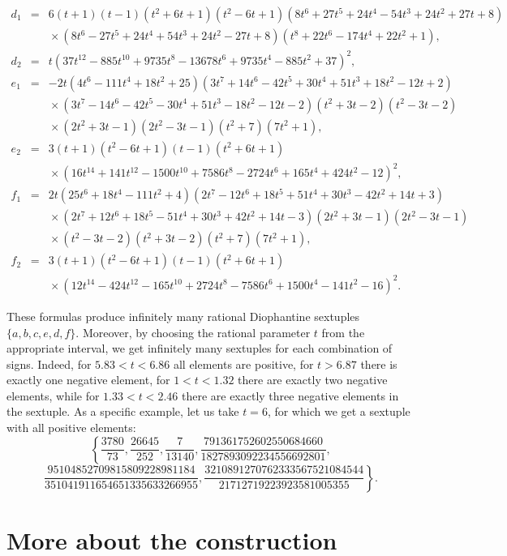 \documentclass[11pt]{amsart}
\theoremstyle{plain}
\theoremstyle{remark}
\begin{document}
{\small
\begin{eqnarray*}
d_1&\!\!=\!\!& 6(t+1)(t-1)(t^2+6t+1)(t^2-6t+1)(8t^6+27t^5+24t^4-54t^3+24t^2+27t+8) \\
& & \mbox{}\times (8t^6-27t^5+24t^4+54t^3+24t^2-
27t+8)(t^8+22t^6-174t^4+22t^2+1), \\
d_2&\!\!=\!\!&t(37t^{12}-885t^{10}+9735t^8-13678t^6+9735t^4-885t^2+37)^2, \\
e_1&\!\!=\!\!&
-2t(4t^6-111t^4+18t^2+25)(3t^7+14t^6-42t^5+30t^4+51t^3+18t^2-12t+2) \\
& & \mbox{}\times (3t^7-14t^6-42t^5-
30t^4+51t^3-18t^2-12t-2)(t^2+3t-2)(t^2-3t-2)\\
& & \mbox{}\times (2t^2+3t-1)(2t^2-3t-1)(t^2+7)(7t^2+1), \\
e_2&\!\!=\!\!&
3(t+1)(t^2-6t+1)(t-1)(t^2+6t+1) \\
& & \mbox{}\times (16t^{14}+141t^{12}-1500t^{10}+7586t^8-2724t^6+165t^4+424t^2-12)^2, \\
f_1&\!\!=\!\!&
2t(25t^6+18t^4-111t^2+4)(2t^7-12t^6+18t^5+51t^4+30t^3-42t^2+14t+3)\\
& & \mbox{}\times (2t^7+12t^6+18t^5-
51t^4+30t^3+42t^2+14t-3)(2t^2+3t-1)(2t^2-3t-1)\\
& & \mbox{}\times (t^2-3t-2)(t^2+3t-2)(t^2+7)(7t^2+1), \\
f_2&\!\!=\!\!&
3(t+1)(t^2-6t+1)(t-1)(t^2+6t+1)\\
& & \mbox{}\times (12t^{14}-424t^{12}-165t^{10}+2724t^8-7586t^6+1500t^4-141t^2-16)^2.
\end{eqnarray*} }%

These formulas produce infinitely many rational Diophantine sextuples
$\{a,b,c,e,d,f\}$. Moreover, by choosing the rational parameter $t$ from the appropriate interval, we get infinitely many sextuples for each combination of signs. Indeed, for $5.83 < t < 6.86$ all elements are positive, for $t > 6.87$ there is exactly one negative element,
for $1 < t < 1.32$ there are exactly two negative elements, while for $1.33 < t < 2.46$ there are exactly three negative elements in the sextuple. As a specific example, let us take $t=6$, for which we get a sextuple
with all positive elements:
$$
\left \{ \frac{3780}{73}, \frac{26645}{252}, \frac{7}{13140},
\frac{791361752602550684660}{1827893092234556692801}, \right.
$$
$$
\left. \frac{95104852709815809228981184}{351041911654651335633266955},  \frac{3210891270762333567521084544}{21712719223923581005355} \right\}.
$$

\section{More about the construction}
\label{sec4}
\end{document}
